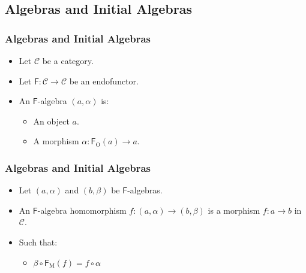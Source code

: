 \documentclass{beamer}
\DeclareMathOperator{\obj}{O}
\DeclareMathOperator{\mor}{M}
\newcommand{\comp}{\ensuremath{\mathrel{\circ}}}
\newcommand{\cat}[1]{\ensuremath{\mathcal{#1}}}
\newcommand{\func}[1]{\ensuremath{\mathsf{#1}}}
\newcommand{\funcO}[1]{\ensuremath{\func{#1}_{\obj}}}
\newcommand{\funcM}[1]{\ensuremath{\func{#1}_{\mor}}}
\begin{document}
\subsection{Algebras and Initial Algebras}


\begin{frame}
  \frametitle{Algebras and Initial Algebras}

  \begin{itemize}
  \item
    Let \cat{C} be a category.
  \item
    Let $\func{F}: \cat{C} \to \cat{C}$ be an endofunctor.
  \end{itemize}
  \begin{definition}[Algebra]
    \begin{itemize}
    \item
      An \func{F}-algebra $(a, \alpha)$ is:
      \begin{itemize}
      \item
        An object $a$.
      \item
        A morphism $\alpha: \funcO{F}(a) \to a$.
      \end{itemize}
    \end{itemize}
  \end{definition}

\end{frame}


\begin{frame}
  \frametitle{Algebras and Initial Algebras}

  \begin{definition}
    \begin{itemize}
    \item
      Let $(a,\alpha)$ and $(b,\beta)$ be \func{F}-algebras.
    \item
      An \func{F}-algebra homomorphism $f: (a,\alpha) \to (b,\beta)$
      is a morphism $f: a \to b$ in $\cat{C}$.
    \item
      Such that:
      \begin{itemize}
      \item
        $\beta \comp \funcM{F}(f) = f \comp \alpha$
      \end{itemize}
    \end{itemize}
  \end{definition}

\end{frame}
\end{document}
